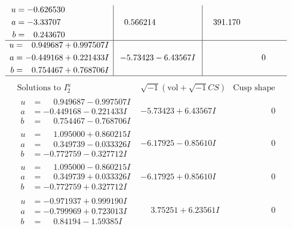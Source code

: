 \documentclass[1p]{elsarticle_modified}
\theoremstyle{definition}
\newcommand{\I}{\sqrt{-1}}
\begin{document}
$$\begin{array}{c|c|c}
\begin{aligned}
u &= -0.626530\phantom{ +0.000000I} \\
a &= -3.33707\phantom{ +0.000000I} \\
b &= \phantom{-}0.243670\phantom{ +0.000000I}\end{aligned}
 & \phantom{-}0.566214\phantom{ +0.000000I} & \phantom{-}391.170\phantom{ +0.000000I} \\ \hline\begin{aligned}
u &= \phantom{-}0.949687 + 0.997507 I \\
a &= -0.449168 + 0.221433 I \\
b &= \phantom{-}0.754467 + 0.768706 I\end{aligned}
 & -5.73423 - 6.43567 I & \phantom{-0.000000 } 0\\
 \hline 
 \end{array}$$\newpage$$\begin{array}{c|c|c}  
\text{Solutions to }I^u_{2}& \I (\text{vol} + \sqrt{-1}CS) & \text{Cusp shape}\\
 \hline 
\begin{aligned}
u &= \phantom{-}0.949687 - 0.997507 I \\
a &= -0.449168 - 0.221433 I \\
b &= \phantom{-}0.754467 - 0.768706 I\end{aligned}
 & -5.73423 + 6.43567 I & \phantom{-0.000000 } 0 \\ \hline\begin{aligned}
u &= \phantom{-}1.095000 + 0.860215 I \\
a &= \phantom{-}0.349739 - 0.033326 I \\
b &= -0.772759 - 0.327712 I\end{aligned}
 & -6.17925 - 0.85610 I & \phantom{-0.000000 } 0 \\ \hline\begin{aligned}
u &= \phantom{-}1.095000 - 0.860215 I \\
a &= \phantom{-}0.349739 + 0.033326 I \\
b &= -0.772759 + 0.327712 I\end{aligned}
 & -6.17925 + 0.85610 I & \phantom{-0.000000 } 0 \\ \hline\begin{aligned}
u &= -0.971937 + 0.999190 I \\
a &= -0.799969 + 0.723013 I \\
b &= \phantom{-}0.84194 - 1.59385 I\end{aligned}
 & \phantom{-}3.75251 + 6.23561 I & \phantom{-0.000000 } 0 \\ \hline\begin{aligned}

\end{aligned}
\end{array}$$
\end{document}
